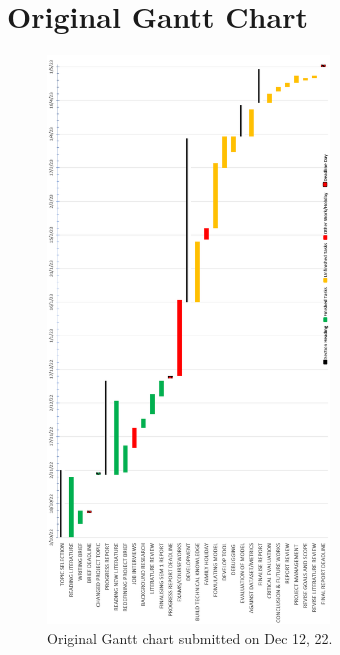 \chapter{Original Gantt Chart}


\begin{figure}[!htb]
    \includegraphics[width=7.5cm,center]{Figures/oldGantt.png}
    \caption*{Original Gantt chart submitted on Dec 12, 22.}
    \label{Figure:OriginalGantt}
\end{figure}